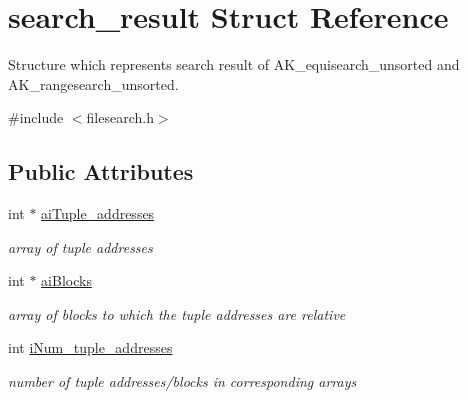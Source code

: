 \hypertarget{structsearch__result}{}\section{search\+\_\+result Struct Reference}
\label{structsearch__result}


Structure which represents search result of A\+K\+\_\+equisearch\+\_\+unsorted and A\+K\+\_\+rangesearch\+\_\+unsorted.  




{\ttfamily \#include $<$filesearch.\+h$>$}

\subsection*{Public Attributes}
\begin{DoxyCompactItemize}
\item 
\mbox{\label{structsearch__result_af2cb5dfee775be70399ba31416737727}} 
int $\ast$ \hyperlink{structsearch__result_af2cb5dfee775be70399ba31416737727}{ai\+Tuple\+\_\+addresses}
\begin{DoxyCompactList}\small\item\em array of tuple addresses \end{DoxyCompactList}\item 
\mbox{\label{structsearch__result_a4ba8a4ba679981a3e3273e3089a01a8f}} 
int $\ast$ \hyperlink{structsearch__result_a4ba8a4ba679981a3e3273e3089a01a8f}{ai\+Blocks}
\begin{DoxyCompactList}\small\item\em array of blocks to which the tuple addresses are relative \end{DoxyCompactList}\item 
\mbox{\label{structsearch__result_a983f29e754aa7f890ee2b688b1d7a9b9}} 
int \hyperlink{structsearch__result_a983f29e754aa7f890ee2b688b1d7a9b9}{i\+Num\+\_\+tuple\+\_\+addresses}
\begin{DoxyCompactList}\small\item\em number of tuple addresses/blocks in corresponding arrays \end{DoxyCompactList}\item 
\mbox{\label{structsearch__result_a7017e2fb19d50df97aad9224f8cba682}} 

\end{DoxyCompactItemize}
